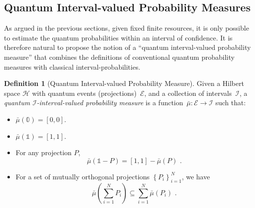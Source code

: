 \documentclass[12pt]{iopart}
\theoremstyle{plain}
\theoremstyle{definition}
\newtheorem{definition}[thm]{Definition}
\theoremstyle{remark}
\newcommand{\Hilb}{\mathcal{H}}
\newcommand{\events}{\ensuremath{\mathcal{E}}}
\begin{document}


\subsection{Quantum Interval-valued Probability Measures}

As argued in the previous sections, given fixed finite resources,
it is only possible to estimate the quantum probabilities within an
interval of confidence. It is therefore natural to propose the notion
of a ``quantum interval-valued probability measure'' that combines
the definitions of conventional quantum probability measures with
classical interval-probabilities.

\begin{definition}[Quantum Interval-valued Probability Measure]\label{def:QuantumInterval-valuedProbability}
Given a Hilbert space $\Hilb$ with quantum events (projections)~$\events$,
and a collection of intervals~$\mathscr{I}$, a \emph{quantum $\mathscr{I}$-interval-valued
probability measure} is a function~$\bar{\mu}:\events\rightarrow\mathscr{I}$
such that: 
\begin{itemize}
\item $\bar{\mu}(\mathbb{0})=\left[0,0\right]$. 
\item $\bar{\mu}(\mathbb{1})=\left[1,1\right]$. 
\item For any projection $P$, 
\begin{equation}
\bar{\mu}\left(\mathbb{1}-P\right)=\left[1,1\right]-\bar{\mu}\left(P\right)\textrm{ .}\label{eq:QuantumInterval-valuedProbability-Complement}
\end{equation}
\item For a set of mutually orthogonal projections $\left\{ P_{i}\right\} _{i=1}^{N}$,
we have 
\begin{equation}
\bar{\mu}\left(\sum_{i=1}^{N}P_{i}\right)\subseteq\sum_{i=1}^{N}\bar{\mu}\left(P_{i}\right)\textrm{ .}\label{eq:QuantumInterval-valuedProbability-Inclusion}
\end{equation}
\end{itemize}
\end{definition}
\end{document}
